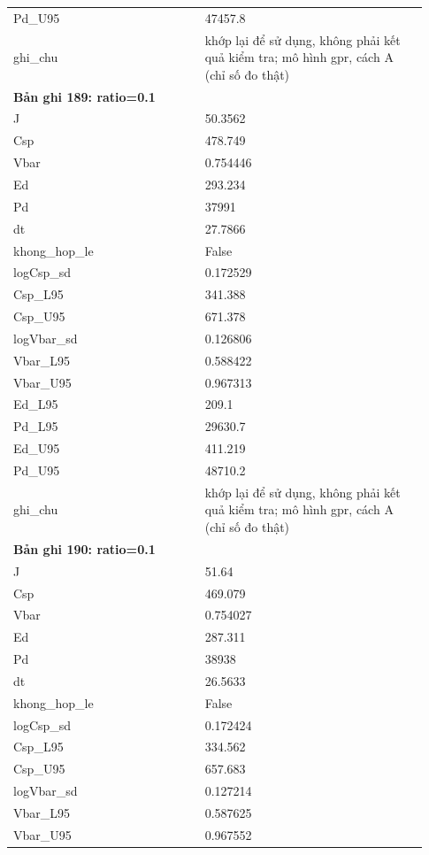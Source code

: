 \begin{longtable}{p{0.43\linewidth}p{0.50\linewidth}}
Pd\_\allowbreak U95 & 47457.8 \\
ghi\_\allowbreak chu & khớp lại để sử dụng, không phải kết quả kiểm tra; mô hình gpr, cách A (chỉ số đo thật) \\
\midrule
\multicolumn{2}{p{0.95\linewidth}}{\textbf{Bản ghi 189: ratio=0.1}} \\
J & 50.3562 \\
Csp & 478.749 \\
Vbar & 0.754446 \\
Ed & 293.234 \\
Pd & 37991 \\
dt & 27.7866 \\
khong\_\allowbreak hop\_\allowbreak le & False \\
logCsp\_\allowbreak sd & 0.172529 \\
Csp\_\allowbreak L95 & 341.388 \\
Csp\_\allowbreak U95 & 671.378 \\
logVbar\_\allowbreak sd & 0.126806 \\
Vbar\_\allowbreak L95 & 0.588422 \\
Vbar\_\allowbreak U95 & 0.967313 \\
Ed\_\allowbreak L95 & 209.1 \\
Pd\_\allowbreak L95 & 29630.7 \\
Ed\_\allowbreak U95 & 411.219 \\
Pd\_\allowbreak U95 & 48710.2 \\
ghi\_\allowbreak chu & khớp lại để sử dụng, không phải kết quả kiểm tra; mô hình gpr, cách A (chỉ số đo thật) \\
\midrule
\multicolumn{2}{p{0.95\linewidth}}{\textbf{Bản ghi 190: ratio=0.1}} \\
J & 51.64 \\
Csp & 469.079 \\
Vbar & 0.754027 \\
Ed & 287.311 \\
Pd & 38938 \\
dt & 26.5633 \\
khong\_\allowbreak hop\_\allowbreak le & False \\
logCsp\_\allowbreak sd & 0.172424 \\
Csp\_\allowbreak L95 & 334.562 \\
Csp\_\allowbreak U95 & 657.683 \\
logVbar\_\allowbreak sd & 0.127214 \\
Vbar\_\allowbreak L95 & 0.587625 \\
Vbar\_\allowbreak U95 & 0.967552 \\

\end{longtable}
